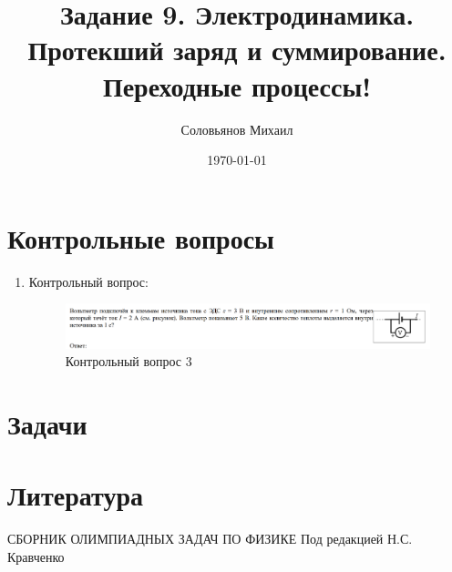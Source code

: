 \documentclass[a4paper,12pt]{article} %
\author{Соловьянов Михаил }
\title{Задание 9. Электродинамика.  Протекший заряд и суммирование. Переходные процессы!}
\date{\today}
\begin{document}
\maketitle







\section{Контрольные вопросы}
\begin{enumerate}






\item Контрольный вопрос:
\begin{figure}[H]
\centering
  \includegraphics[width=1.1\linewidth]{KV1.PNG}
  \caption{Контрольный вопрос 3}
  \label{task0}
\end{figure}

\end{enumerate}


\section{Задачи}
\begin{enumerate}









\end{enumerate}

\section{Литература}
\begin{thebibliography}{}
     СБОРНИК ОЛИМПИАДНЫХ ЗАДАЧ ПО ФИЗИКЕ Под редакцией Н.С. Кравченко
	
\end{thebibliography}
\end{document}
